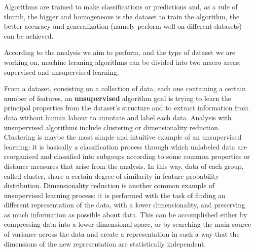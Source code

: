 \documentclass[10pt]{report}
\begin{document}
Algorithms are trained to make classifications or predictions and, as a rule of thumb, the bigger and homogeneous is the dataset to train the algorithm, the better accuracy and generalization (namely perform well on different datasets) can be achieved.

According to the analysis we aim to perform, and the type of dataset we are working on, machine leraning algorithms can be divided into two macro areas: supervised and unsupervised learning.

From a dataset, consisting on a collection of data, each one containing a certain number of features, an \textbf{unsupervised} algorithm goal is trying to learn the principal properties from the dataset's structure and to extract information from data without human labour to annotate and label each data.
Analysis with unsupervised algorithms include clustering or dimensionality reduction.
Clustering is maybe the most simple and intuitive example of an unsupervised learning: it is basically a classification process through which unlabeled data are reorganised and classified into subgoups according to some common properties or distance measures that arise from the analysis.
In this way, data of each group, called cluster, share a certain degree of similarity in feature probability distribution.
Dimensionality reduction is another common example of unsupervised learning process: it is performed with the task of finding an different representation of the data, with a lower dimensionality, and preserving as much information as possible about data.
This can be accomplished either by compressing data into a lower-dimensional space, or by searching the main source of variance across the data and create a representation in such a way that the dimensions of the new representation are statistically independent.



\end{document}
